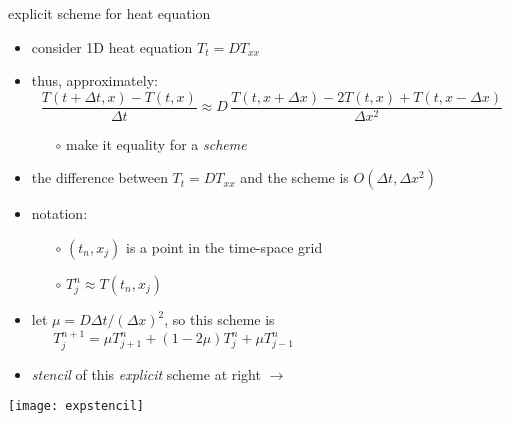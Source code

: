 \begin{frame}{explicit scheme for heat equation}
\label{slide:explicit}

\begin{itemize}
\item consider 1D heat equation $T_t = D T_{xx}$
\item thus, approximately:
\small
	$$\frac{T(t+\Delta t,x) - T(t,x)}{\Delta t} \approx D\,\frac{T(t,x+\Delta x) - 2 T(t,x) + T(t,x-\Delta x)}{\Delta x^2}$$

\normalsize
    \begin{itemize}
    \item[$\circ$] make it equality for a \emph{scheme}
    \end{itemize} 
\item the difference between $T_t = D T_{xx}$ and the scheme is $O(\Delta t,\Delta x^2)$
\item notation:
    \begin{itemize}
    \item[$\circ$] $(t_n,x_j)$ is a point in the time-space grid
    \item[$\circ$] $T_j^n \approx T(t_n,x_j)$  
    \end{itemize} 
\item let $\mu = D \Delta t / (\Delta x)^2$, so this scheme is
\small
	$$T_j^{n+1} = \mu T_{j+1}^n + (1 - 2 \mu) T_j^n + \mu T_{j-1}^n \phantom{sdfkj sdkfj asdlfj asldkfj asdflkj}$$
\normalsize
\item \emph{stencil} of this \emph{explicit} scheme at right \large $\to$ \normalsize
\end{itemize}

\vspace{-15mm}
\hfill \texttt{[image: expstencil]}
\end{frame}


